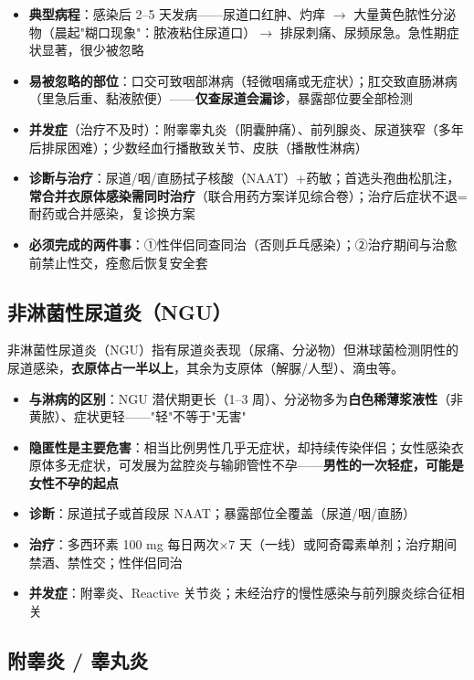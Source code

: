 \begin{itemize}
	\item \textbf{典型病程}：感染后 2--5 天发病——尿道口红肿、灼痒 $\rightarrow$ 大量黄色脓性分泌物（晨起"糊口现象"：脓液粘住尿道口）$\rightarrow$ 排尿刺痛、尿频尿急。急性期症状显著，很少被忽略
	\item \textbf{易被忽略的部位}：口交可致咽部淋病（轻微咽痛或无症状）；肛交致直肠淋病（里急后重、黏液脓便）——\textbf{仅查尿道会漏诊}，暴露部位要全部检测
	\item \textbf{并发症}（治疗不及时）：附睾睾丸炎（阴囊肿痛）、前列腺炎、尿道狭窄（多年后排尿困难）；少数经血行播散致关节、皮肤（播散性淋病）
	\item \textbf{诊断与治疗}：尿道/咽/直肠拭子核酸（NAAT）+药敏；首选头孢曲松肌注，\textbf{常合并衣原体感染需同时治疗}（联合用药方案详见综合卷）；治疗后症状不退=耐药或合并感染，复诊换方案
	\item \textbf{必须完成的两件事}：①性伴侣同查同治（否则乒乓感染）；②治疗期间与治愈前禁止性交，痊愈后恢复安全套
\end{itemize}

\subsection{非淋菌性尿道炎（NGU）}


非淋菌性尿道炎（NGU）指有尿道炎表现（尿痛、分泌物）但淋球菌检测阴性的尿道感染，\textbf{衣原体占一半以上}，其余为支原体（解脲/人型）、滴虫等。

\begin{itemize}
	\item \textbf{与淋病的区别}：NGU 潜伏期更长（1--3 周）、分泌物多为\textbf{白色稀薄浆液性}（非黄脓）、症状更轻——"轻"不等于"无害"
	\item \textbf{隐匿性是主要危害}：相当比例男性几乎无症状，却持续传染伴侣；女性感染衣原体多无症状，可发展为盆腔炎与输卵管性不孕——\textbf{男性的一次轻症，可能是女性不孕的起点}
	\item \textbf{诊断}：尿道拭子或首段尿 NAAT；暴露部位全覆盖（尿道/咽/直肠）
	\item \textbf{治疗}：多西环素 100 mg 每日两次×7 天（一线）或阿奇霉素单剂；治疗期间禁酒、禁性交；性伴侣同治
	\item \textbf{并发症}：附睾炎、Reactive 关节炎；未经治疗的慢性感染与前列腺炎综合征相关
\end{itemize}

\subsection{附睾炎 / 睾丸炎}


